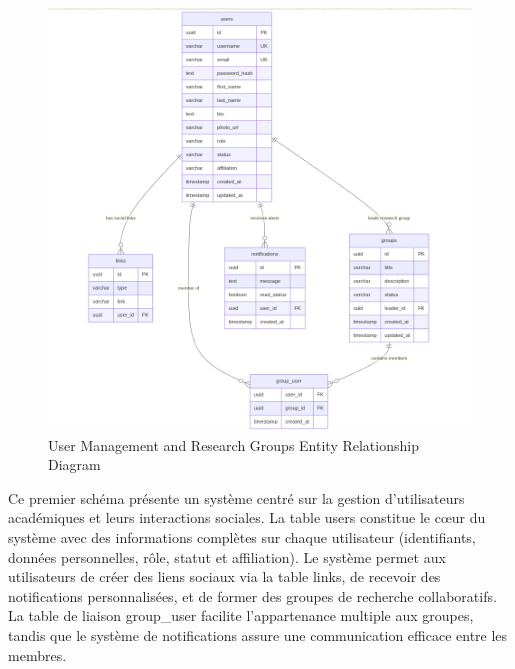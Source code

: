 \documentclass{rapportPfe}
\begin{document}
\begin{figure}[htbp]
    \centering
    \includegraphics[width=1.0\textwidth]{diagrams/diagram5.png}
    \caption{User Management and Research Groups Entity Relationship Diagram}
    \label{fig:diagram5}
\end{figure}

Ce premier schéma présente un système centré sur la gestion d'utilisateurs académiques et leurs interactions sociales. La table users constitue le cœur du système avec des informations complètes sur chaque utilisateur (identifiants, données personnelles, rôle, statut et affiliation). Le système permet aux utilisateurs de créer des liens sociaux via la table links, de recevoir des notifications personnalisées, et de former des groupes de recherche collaboratifs. La table de liaison group\_user facilite l'appartenance multiple aux groupes, tandis que le système de notifications assure une communication efficace entre les membres.
\end{document}
